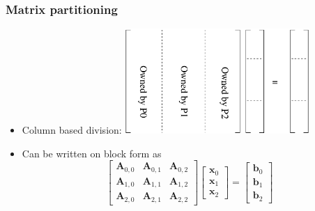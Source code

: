 \documentclass{beamer}
\begin{document}
\begin{frame}\frametitle{Matrix partitioning}
\begin{itemize}
  \item Column based division:
     \includegraphics[width=7cm]{cols}
  \item Can be written on block form as
        \[
           \begin{bmatrix}
                \mathbf{A}_{0,0} & \mathbf{A}_{0,1} & \mathbf{A}_{0,2} \\
                \mathbf{A}_{1,0} & \mathbf{A}_{1,1} & \mathbf{A}_{1,2} \\
                \mathbf{A}_{2,0} & \mathbf{A}_{2,1} & \mathbf{A}_{2,2}
           \end{bmatrix}\begin{bmatrix}
                          \mathbf{x}_0 \\
                          \mathbf{x}_1 \\
                          \mathbf{x}_2
                        \end{bmatrix} = \begin{bmatrix}
                                          \mathbf{b}_0 \\
                                          \mathbf{b}_1 \\
                                          \mathbf{b}_2
                                        \end{bmatrix}
        \]
\end{itemize}
\end{frame}
\end{document}
